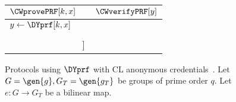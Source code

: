 \begin{figure}
  \centering
  \small
  \begin{tabular}{lcl}
    \(\CWprovePRF[k, x]\)
    &
    & \(\CWverifyPRF[y]\)
    \\\toprule

    \(y\gets \DYprf[k, x]\)
    &
    &

    \\\\

    \multicolumn{3}{c}{\PK[k][y = \DYprf[k, x]]}

    \\%
  \end{tabular}
  \caption{\label{ACprfPKalg}%
    Protocols using \(\DYprf\) with CL anonymous 
    credentials~\cite{HowToWinTheCloneWars}.
    Let \(G = \gen{g}, G_T = \gen{g_T}\) be groups of prime order \(q\).
    Let \(e\colon G\to G_T\) be a bilinear map.
  }
\end{figure}


